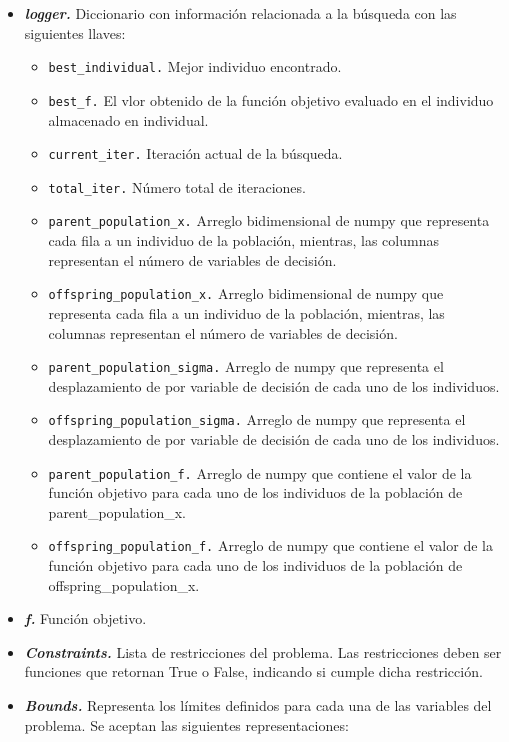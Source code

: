 \documentclass[11pt]{article}
\providecommand{\tightlist}{%
      \setlength{\itemsep}{0pt}\setlength{\parskip}{0pt}}
\begin{document}
\begin{itemize}
\item
  \emph{\textbf{logger.}} Diccionario con información relacionada a la
  búsqueda con las siguientes llaves:

  \begin{itemize}
  \tightlist
  \item
    \texttt{best\_individual.} Mejor individuo encontrado.
  \item
    \texttt{best\_f.} El vlor obtenido de la función objetivo evaluado
    en el individuo almacenado en individual.
  \item
    \texttt{current\_iter.} Iteración actual de la búsqueda.
  \item
    \texttt{total\_iter.} Número total de iteraciones.
  \item
    \texttt{parent\_population\_x.} Arreglo bidimensional de numpy que
    representa cada fila a un individuo de la población, mientras, las
    columnas representan el número de variables de decisión.
  \item
    \texttt{offspring\_population\_x.} Arreglo bidimensional de numpy
    que representa cada fila a un individuo de la población, mientras,
    las columnas representan el número de variables de decisión.
  \item
    \texttt{parent\_population\_sigma.} Arreglo de numpy que representa
    el desplazamiento de por variable de decisión de cada uno de los
    individuos.
  \item
    \texttt{offspring\_population\_sigma.} Arreglo de numpy que
    representa el desplazamiento de por variable de decisión de cada uno
    de los individuos.
  \item
    \texttt{parent\_population\_f.} Arreglo de numpy que contiene el
    valor de la función objetivo para cada uno de los individuos de la
    población de parent\_population\_x.
  \item
    \texttt{offspring\_population\_f.} Arreglo de numpy que contiene el
    valor de la función objetivo para cada uno de los individuos de la
    población de offspring\_population\_x.
  \end{itemize}
\item
  \emph{\textbf{f.}} Función objetivo.
\item
  \emph{\textbf{Constraints.}} Lista de restricciones del problema. Las
  restricciones deben ser funciones que retornan True o False, indicando
  si cumple dicha restricción.
\item
  \emph{\textbf{Bounds.}} Representa los límites definidos para cada una
  de las variables del problema. Se aceptan las siguientes
  representaciones:


\end{itemize}
\end{document}
